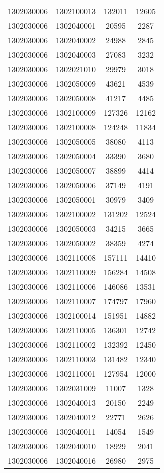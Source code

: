 \begin{longtable}[h]{llcc}
		1302030006 & 1302100013 & 132011 & 12605\\
		1302030006 & 1302040001 & 20595 & 2287\\
		1302030006 & 1302040002 & 24988 & 2845\\
		1302030006 & 1302040003 & 27083 & 3232\\
		1302030006 & 1302021010 & 29979 & 3018\\
		1302030006 & 1302050009 & 43621 & 4539\\
		1302030006 & 1302050008 & 41217 & 4485\\
		1302030006 & 1302100009 & 127326 & 12162\\
		1302030006 & 1302100008 & 124248 & 11834\\
		1302030006 & 1302050005 & 38080 & 4113\\
		1302030006 & 1302050004 & 33390 & 3680\\
		1302030006 & 1302050007 & 38899 & 4414\\
		1302030006 & 1302050006 & 37149 & 4191\\
		1302030006 & 1302050001 & 30979 & 3409\\
		1302030006 & 1302100002 & 131202 & 12524\\
		1302030006 & 1302050003 & 34215 & 3665\\
		1302030006 & 1302050002 & 38359 & 4274\\
		1302030006 & 1302110008 & 157111 & 14410\\
		1302030006 & 1302110009 & 156284 & 14508\\
		1302030006 & 1302110006 & 146086 & 13531\\
		1302030006 & 1302110007 & 174797 & 17960\\
		1302030006 & 1302100014 & 151951 & 14882\\
		1302030006 & 1302110005 & 136301 & 12742\\
		1302030006 & 1302110002 & 132392 & 12450\\
		1302030006 & 1302110003 & 131482 & 12340\\
		1302030006 & 1302110001 & 127954 & 12000\\
		1302030006 & 1302031009 & 11007 & 1328\\
		1302030006 & 1302040013 & 20150 & 2249\\
		1302030006 & 1302040012 & 22771 & 2626\\
		1302030006 & 1302040011 & 14054 & 1549\\
		1302030006 & 1302040010 & 18929 & 2041\\
		1302030006 & 1302040016 & 26980 & 2975\\

\end{longtable}
